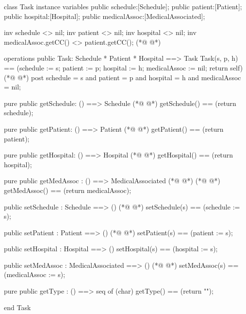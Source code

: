 \begin{vdmpp}[breaklines=true]
class Task
instance variables
  public schedule:[Schedule];
  public patient:[Patient];
  public hospital:[Hospital];
  public medicalAssoc:[MedicalAssociated];
  
  inv schedule <> nil;
  inv patient <> nil;
  inv hospital <> nil;
  inv medicalAssoc.getCC() <> patient.getCC();
(*@
\label{Task:12}
@*)
  
operations
 public Task: Schedule * Patient * Hospital ==> Task
  Task(s, p, h) == (schedule := s; patient := p; hospital := h; medicalAssoc := nil; return self)
(*@
\label{getSchedule:16}
@*)
 post schedule = s and patient = p and hospital = h and medicalAssoc = nil;
 
 pure public getSchedule: () ==> Schedule
(*@
\label{getPatient:19}
@*)
  getSchedule() == (return schedule);
  
 pure public getPatient: () ==> Patient
(*@
\label{getHospital:22}
@*)
  getPatient() == (return patient);
  
 pure public getHospital: () ==> Hospital
(*@
\label{setSchedule:25}
@*)
  getHospital() == (return hospital);
  
 pure public getMedAssoc : () ==> MedicalAssociated
(*@
\label{setPatient:28}
@*)
(*@
\label{getMedAssoc:28}
@*)
  getMedAssoc() == (return medicalAssoc);
  
 public setSchedule : Schedule ==> ()
(*@
\label{setHospital:31}
@*)
  setSchedule(s) == (schedule := s);
  
 public setPatient : Patient ==> ()
(*@
\label{getType:34}
@*)
  setPatient(s) == (patient := s);
  
 public setHospital : Hospital ==> ()
  setHospital(s) == (hospital := s);
 
 public setMedAssoc : MedicalAssociated ==> ()
(*@
\label{setMedAssoc:40}
@*)
  setMedAssoc(s) == (medicalAssoc := s);
  
 pure public getType : () ==> seq of (char) 
  getType() == (return "");

end Task
\end{vdmpp}
